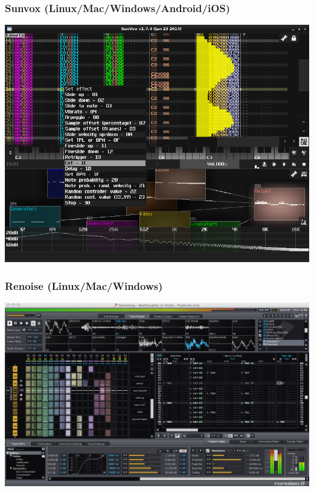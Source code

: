 \documentclass{beamer}
\begin{document}
\begin{frame}
\frametitle{Sunvox (Linux/Mac/Windows/Android/iOS)}
\begin{center}
\includegraphics[scale=0.3]{sunvox}
\end{center}
\end{frame}

\begin{frame}
\frametitle{Renoise (Linux/Mac/Windows)}
\begin{center}
\includegraphics[scale=0.2]{renoise}
\end{center}
\end{frame}
\end{document}
